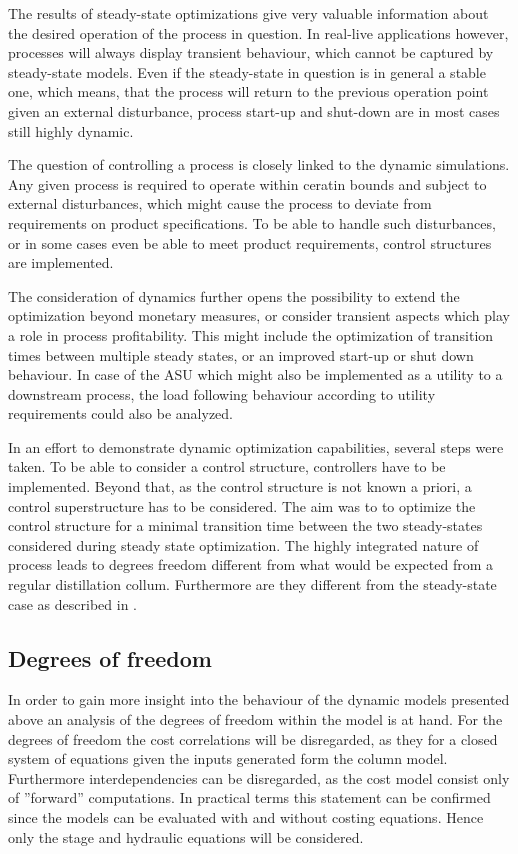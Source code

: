    The results of steady-state optimizations give very valuable information about the desired operation of
    the process in question. In real-live applications however, processes will always display transient behaviour,
    which cannot be captured by steady-state models. Even if the steady-state in question is in general a stable one,
    which means, that the process will return to the previous operation point given an external disturbance, process
    start-up and shut-down are in most cases still highly dynamic.

    The question of controlling a process is closely linked to the dynamic simulations. Any given process is required
    to operate within ceratin bounds and subject to external disturbances, which might cause the process to deviate
    from requirements on product specifications. To be able to handle such disturbances, or in some cases even be able
    to meet product requirements, control structures are implemented.

    The consideration of dynamics further opens the possibility to extend the optimization beyond monetary measures, or
    consider transient aspects which play a role in process profitability. This might include the optimization of transition
    times between multiple steady states, or an improved start-up or shut down behaviour. In case of the ASU which might also
    be implemented as a utility to a downstream process, the load following behaviour according to utility requirements could
    also be analyzed.

    In an effort to demonstrate dynamic optimization capabilities, several steps were taken. To be able to consider a control
    structure, controllers have to be implemented. Beyond that, as the control structure is not known a priori, a control
    superstructure has to be considered. The aim was to to optimize the control structure for a minimal transition time between
    the two steady-states considered during steady state optimization. The highly integrated nature of process leads to degrees
    freedom different from what would be expected from a regular distillation collum. Furthermore are they different
    from the steady-state case as described in .

    \subsection{Degrees of freedom}
        In order to gain more insight into the behaviour of the dynamic models presented above an analysis
        of the degrees of freedom within the model is at hand. For the degrees of freedom the cost correlations
        will be disregarded, as they for a closed system of equations given the inputs generated form the column
        model. Furthermore interdependencies can be disregarded, as the cost model consist only of ''forward''
        computations. In practical terms this statement can be confirmed since the models can be evaluated
        with and without costing equations. Hence only the stage and hydraulic equations will be considered.

